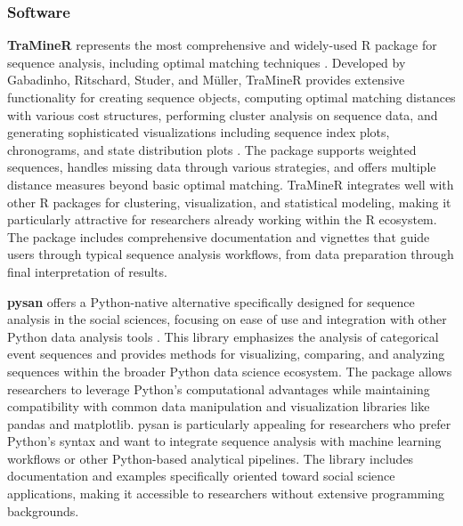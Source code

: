 \documentclass[../main.tex]{subfiles}
\begin{document}
\subsubsection{Software}


\textbf{TraMineR} represents the most comprehensive and widely-used R package for sequence analysis, including optimal matching techniques \citep{traminer_documentation}. Developed by Gabadinho, Ritschard, Studer, and Müller, TraMineR provides extensive functionality for creating sequence objects, computing optimal matching distances with various cost structures, performing cluster analysis on sequence data, and generating sophisticated visualizations including sequence index plots, chronograms, and state distribution plots \citep{traminer_documentation}. The package supports weighted sequences, handles missing data through various strategies, and offers multiple distance measures beyond basic optimal matching. TraMineR integrates well with other R packages for clustering, visualization, and statistical modeling, making it particularly attractive for researchers already working within the R ecosystem. The package includes comprehensive documentation and vignettes that guide users through typical sequence analysis workflows, from data preparation through final interpretation of results.


\textbf{pysan} offers a Python-native alternative specifically designed for sequence analysis in the social sciences, focusing on ease of use and integration with other Python data analysis tools \citep{pysan_github}. This library emphasizes the analysis of categorical event sequences and provides methods for visualizing, comparing, and analyzing sequences within the broader Python data science ecosystem. The package allows researchers to leverage Python's computational advantages while maintaining compatibility with common data manipulation and visualization libraries like pandas and matplotlib. pysan is particularly appealing for researchers who prefer Python's syntax and want to integrate sequence analysis with machine learning workflows or other Python-based analytical pipelines. The library includes documentation and examples specifically oriented toward social science applications, making it accessible to researchers without extensive programming backgrounds.

\end{document}
